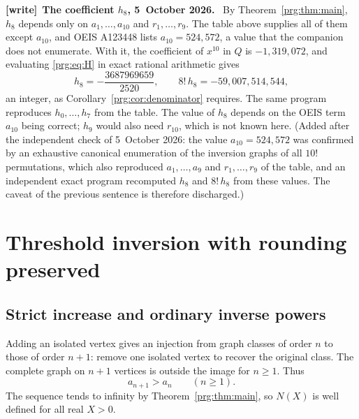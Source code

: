 \documentclass[11pt,letterpaper]{article}
\numberwithin{equation}{section}
\theoremstyle{definition}\newtheorem{definition}[theorem]{Definition}
\theoremstyle{remark}\newtheorem{remark}[theorem]{Remark}
\newenvironment{writenote}[1][]{\par\smallskip\begingroup\small
 \noindent\textbf{[write]}\if\relax\detokenize{#1}\relax\else~\textbf{#1.}\fi\ }%
 {\par\endgroup\smallskip}
\begin{document}
\begin{writenote}[The coefficient $h_8$, 5~October 2026]
By Theorem~\ref{prg:thm:main}, $h_8$ depends only on $a_1,\dots,a_{10}$ and
$r_1,\dots,r_9$. The table above supplies all of them except $a_{10}$, and
OEIS A123448 lists $a_{10}=524{,}572$, a value that the companion does not
enumerate. With it, the coefficient of $x^{10}$ in $Q$ is $-1{,}319{,}072$, and
evaluating \eqref{prg:eq:H} in exact rational arithmetic gives
\[
 h_8=-\frac{3687969659}{2520},\qquad 8!\,h_8=-59{,}007{,}514{,}544,
\]
an integer, as Corollary~\ref{prg:cor:denominator} requires. The same program
reproduces $h_0,\dots,h_7$ from the table. The value of $h_8$ depends on the
OEIS term $a_{10}$ being correct; $h_9$ would also need $r_{10}$, which is not
known here. \textup{(Added after the independent check of 5~October 2026:
the value $a_{10}=524{,}572$ was confirmed by an exhaustive canonical
enumeration of the inversion graphs of all $10!$ permutations, which also
reproduced $a_1,\dots,a_9$ and $r_1,\dots,r_9$ of the table, and an
independent exact program recomputed $h_8$ and $8!\,h_8$ from these values.
The caveat of the previous sentence is therefore discharged.)}
\end{writenote}

\section{Threshold inversion with rounding preserved}\label{prg:sec:inverse}

\subsection{Strict increase and ordinary inverse powers}
Adding an isolated vertex gives an injection from graph classes of
order $n$ to those of order $n+1$: remove one isolated vertex to
recover the original class. The complete graph on $n+1$ vertices
is outside the image for $n\geq1$. Thus
\begin{equation}\label{prg:eq:monotonicity}
 a_{n+1}>a_n\qquad(n\geq1).
\end{equation}
The sequence tends to infinity by Theorem~\ref{prg:thm:main}, so $N(X)$
is well defined for all real $X>0$.
\end{document}

